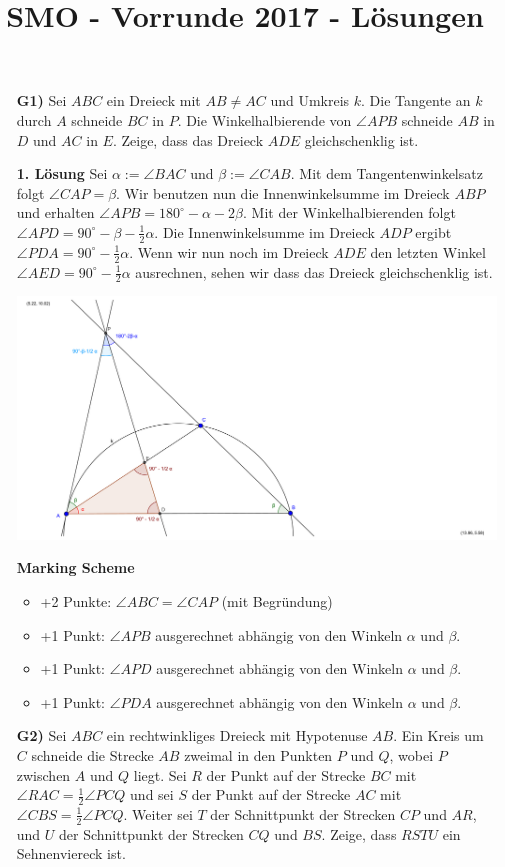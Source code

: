 \documentclass[language=german,style=solution]{smo}
\title{SMO - Vorrunde 2017 - Lösungen}
\begin{document}
\begin{enumerate}

\item[\textbf{G1)}] 
Sei $ABC$ ein Dreieck mit $AB \neq AC$ und Umkreis $k$. Die Tangente an $k$ durch $A$ schneide $BC$ in $P$. Die Winkelhalbierende von $\angle APB$ schneide $AB$ in $D$ und $AC$ in $E$. Zeige, dass das Dreieck $ADE$ gleichschenklig ist.

\textbf{1. Lösung}
Sei $\alpha := \angle BAC$ und $\beta := \angle CAB$. Mit dem Tangentenwinkelsatz folgt $\angle CAP = \beta$. Wir benutzen nun die Innenwinkelsumme im Dreieck $ABP$ und erhalten $\angle APB = 180^\circ- \alpha - 2 \beta$. Mit der Winkelhalbierenden folgt $\angle APD = 90^\circ - \beta - \frac{1}{2}\alpha$. Die Innenwinkelsumme im Dreieck $ADP$ ergibt $\angle PDA = 90^\circ - \frac{1}{2}\alpha$. Wenn wir nun noch im Dreieck $ADE$ den letzten Winkel $\angle AED = 90^\circ - \frac{1}{2}\alpha$ ausrechnen, sehen wir dass das Dreieck gleichschenklig ist.

\includegraphics[width=1.5\textwidth,clip=100]{G1.pdf}

\textbf{Marking Scheme}
\begin{itemize}
\item +2 Punkte: $\angle ABC = \angle CAP$ (mit Begründung)
\item +1 Punkt: $\angle APB$ ausgerechnet abhängig von den Winkeln $\alpha$ und $\beta$.
\item +1 Punkt: $\angle APD$ ausgerechnet abhängig von den Winkeln $\alpha$ und $\beta$.
\item +1 Punkt: $\angle PDA$ ausgerechnet abhängig von den Winkeln $\alpha$ und $\beta$.
\end{itemize}

\newpage

\item[\textbf{G2)}] 
Sei $ABC$ ein rechtwinkliges Dreieck mit Hypotenuse $AB$. Ein Kreis um $C$ schneide die Strecke $AB$ zweimal in den Punkten $P$ und $Q$, wobei $P$ zwischen $A$ und $Q$ liegt. Sei $R$ der Punkt auf der Strecke $BC$ mit $\angle RAC=\frac{1}{2}\angle PCQ$ und sei $S$ der Punkt auf der Strecke $AC$ mit $\angle CBS=\frac{1}{2}\angle PCQ$. Weiter sei $T$ der Schnittpunkt der Strecken $CP$ und $AR$, und $U$ der Schnittpunkt der Strecken $CQ$ und $BS$.
Zeige, dass $RSTU$ ein Sehnenviereck ist.


\end{enumerate}
\end{document}
